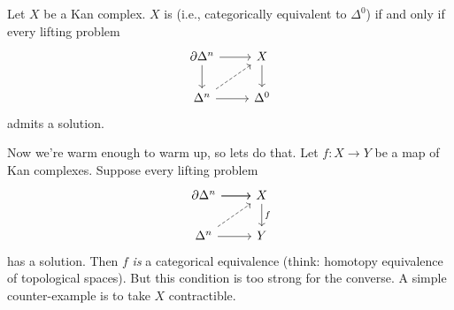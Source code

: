 \begin{lemma}
	Let $X$ be a Kan complex. $X$ is  (i.e., categorically equivalent to $\Delta^{0}$) if and only if every lifting problem
	\[
	\begin{tikzcd}
		\partial \Delta^{n} \ar[r] \ar[d] & X \ar[d] \\
		\Delta^{n} \ar[ur,dashed] \ar[r] & \Delta^{0}
	\end{tikzcd}
	\] 
	admits a solution.
\end{lemma}
Now we're warm enough to warm up, so lets do that. Let $f:X\to Y$ be a map of Kan complexes. Suppose every lifting problem
\[
\begin{tikzcd}
	\partial \Delta^{n} \ar[r] \ar[r] & X \ar[d,"f"] \\
	\Delta^{n} \ar[ur,dashed] \ar[r] & Y
\end{tikzcd}
\] 
has a solution. Then $f$ \emph{is} a categorical equivalence (think: homotopy equivalence of topological spaces). But this condition is too strong for the converse. A simple counter-example is to take $X$ contractible.

